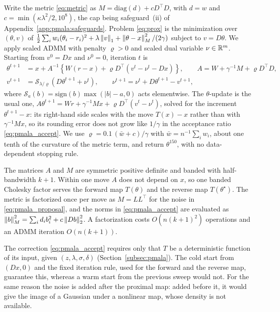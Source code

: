 Write the metric \eqref{eq:metric} as $M = \mathrm{diag}(d) + cD^\top D$, with $d = w$ and $c = \min(\kappa\lambda^2/2, 10^8)$, the cap being safeguard~(ii) of Appendix~\ref{app:pmala:safeguards}. Problem \eqref{eq:prox} is the minimization over $(\theta, v)$ of $\frac12\sum_i w_i(\theta_i - r_i)^2 + \lambda\left\lVert v\right\rVert_1 + \left\lVert\theta - x\right\rVert_M^2/(2\gamma)$ subject to $v = D\theta$. We apply scaled ADMM with penalty $\varrho > 0$ and scaled dual variable $\nu \in \mathbb{R}^m$. Starting from $v^0 = Dx$ and $\nu^0 = 0$, iteration $t$ is
\begin{align*}
\theta^{t+1} &= x + A^{-1}\left\{ W(r - x) + \varrho D^\top (v^t - \nu^t - Dx) \right\}, \qquad A = W + \gamma^{-1} M + \varrho D^\top D, \\
v^{t+1} &= \mathcal{S}_{\lambda/\varrho}\!\left(D\theta^{t+1} + \nu^t\right), \qquad
\nu^{t+1} = \nu^t + D\theta^{t+1} - v^{t+1},
\end{align*}
where $\mathcal{S}_a(b) = \mathrm{sign}(b)\max(|b| - a, 0)$ acts elementwise. The $\theta$-update is the usual one, $A\theta^{t+1} = Wr + \gamma^{-1}Mx + \varrho D^\top(v^t - \nu^t)$, solved for the increment $\theta^{t+1} - x$: its right-hand side scales with the move $T(x) - x$ rather than with $\gamma^{-1}Mx$, so its rounding error does not grow like $1/\gamma$ in the acceptance ratio \eqref{eq:pmala_accept}. We use $\varrho = 0.1\,(\bar w + c)/\gamma$ with $\bar w = n^{-1}\sum_i w_i$, about one tenth of the curvature of the metric term, and return $\theta^{150}$, with no data-dependent stopping rule.

The matrices $A$ and $M$ are symmetric positive definite and banded with half-bandwidth $k+1$. Within one move $A$ does not depend on $x$, so one banded Cholesky factor serves the forward map $T(\theta)$ and the reverse map $T(\theta^\star)$. The metric is factorized once per move as $M = LL^\top$ for the noise in \eqref{eq:pmala_proposal}, and the norms in \eqref{eq:pmala_accept} are evaluated as $\left\lVert b\right\rVert_M^2 = \sum_i d_i b_i^2 + c\left\lVert Db\right\rVert_2^2$. A factorization costs $O(n(k+1)^2)$ operations and an ADMM iteration $O(n(k+1))$.

The correction \eqref{eq:pmala_accept} requires only that $T$ be a deterministic function of its input, given $(z, \lambda, \sigma, \delta)$ (Section~\ref{subsec:pmala}). The cold start from $(Dx, 0)$ and the fixed iteration rule, used for the forward and the reverse map, guarantee this, whereas a warm start from the previous sweep would not. For the same reason the noise is added after the proximal map: added before it, it would give the image of a Gaussian under a nonlinear map, whose density is not available.

